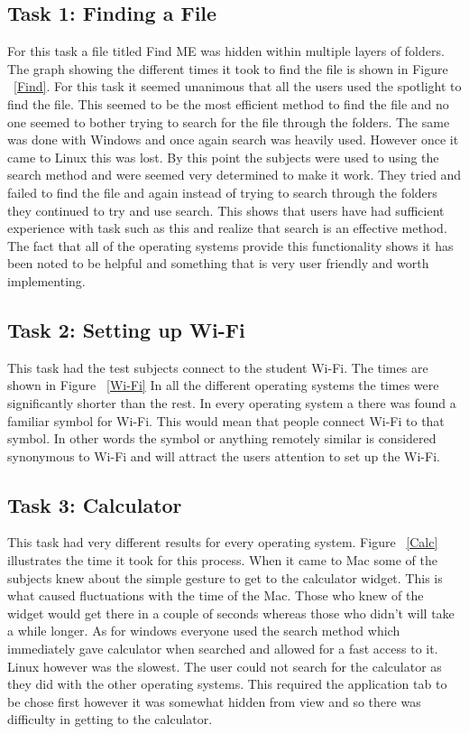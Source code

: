 \documentclass[11pt]{article}
\begin{document}
\subsection{Task 1: Finding a File}
For this task a file titled Find ME was hidden within multiple layers of folders. The graph showing the different times it took to find the file is shown in Figure ~\ref{Find}. For this task it seemed unanimous that all the users used the spotlight to find the file. This seemed to be the most efficient method to find the file and no one seemed to bother trying to search for the file through the folders. The same was done with Windows and once again search was heavily used. However once it came to Linux this was lost. By this point the subjects were used to using the search method and were seemed very determined to make it work. They tried and failed to find the file and again instead of trying to search through the folders they continued to try and use search. This shows that users have had sufficient experience with task such as this and realize that search is an effective method. The fact that all of the operating systems provide this functionality shows it has been noted to be helpful and something that is very user friendly and worth implementing.

\subsection{Task 2: Setting up Wi-Fi}
This task had the test subjects connect to the student Wi-Fi. The times are shown in Figure ~\ref{Wi-Fi} In all the different operating systems the times were significantly shorter than the rest. In every operating system a there was found a familiar symbol for Wi-Fi. This would mean that people connect Wi-Fi to that symbol. In other words the symbol or anything remotely similar is considered synonymous to Wi-Fi and will attract the users attention to set up the Wi-Fi.

\subsection{Task 3: Calculator}
This task had very different results for every operating system. Figure ~\ref{Calc} illustrates the time it took for this process. When it came to Mac some of the subjects knew about the simple gesture to get to the calculator widget. This is what caused fluctuations with the time of the Mac. Those who knew of the widget would get there in a couple of seconds whereas those who didn’t will take a while longer. As for windows everyone used the search method which immediately gave calculator when searched and allowed for a fast access to it. Linux however was the slowest. The user could not search for the calculator as they did with the other operating systems. This required the application tab to be chose first however it was somewhat hidden from view and so there was difficulty in getting to the calculator.
\end{document}
